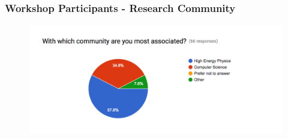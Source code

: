 \begin{frame}
\frametitle{Workshop Participants - Research Community}

\begin{figure}[htbp]
\begin{center}
\includegraphics[width=1.0\textwidth]{images/s2i2-hep-cs-princeton-3-community.png}
\end{center}
\end{figure}

\end{frame}


